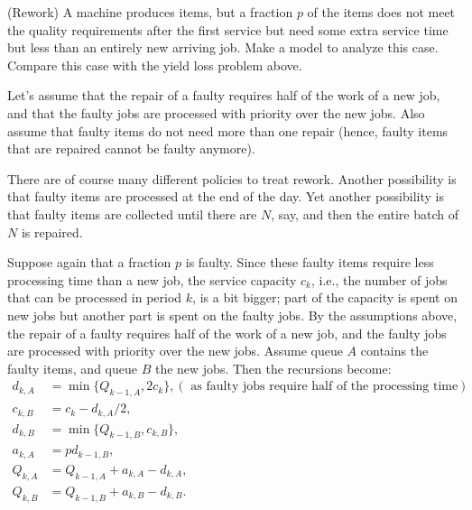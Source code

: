 \begin{exercise}
  (Rework) A machine produces items, but a fraction $p$ of the items
  does not meet the quality requirements after the first service but
  need some extra service time but less than an entirely new arriving
  job. Make a model to analyze this case. Compare this case with the
  yield loss problem above. 

  Let's assume that the repair of a faulty requires half of the work
  of a new job, and that the faulty jobs are processed with priority
  over the new jobs.  Also assume that faulty items do not need more than one repair (hence, faulty items that are repaired cannot be faulty anymore).

There are of course many different policies to
  treat rework.   Another possibility is that faulty items are processed at the end of
  the day. Yet another possibility is that faulty items are collected
  until there are $N$, say, and then the entire batch of $N$ is
  repaired.
  \begin{solution}
    Suppose again that a fraction $p$ is faulty. Since these faulty
    items require less processing time than a new job, the service
    capacity $c_k$, i.e., the number of jobs that can be processed in
    period $k$, is a bit bigger; part of the capacity is spent on new
    jobs but another part is spent on the faulty jobs. By the
    assumptions above, the repair of a faulty requires half of the
    work of a new job, and the faulty jobs are processed with priority
    over the new jobs. Assume queue $A$ contains the faulty items, and
    queue $B$ the new jobs. Then the recursions become:
\begin{equation*}
  \begin{split}
    d_{k,A} &= \min\{Q_{k-1, A}, 2c_k\}, (\text{ as faulty jobs require half of the processing time})\\
    c_{k,B} &= c_k - d_{k,A}/2, \\
    d_{k,B} &= \min\{Q_{k-1, B}, c_{k,B}\}, \\
    a_{k,A} &= p d_{k-1, B}, \\
    Q_{k,A} &= Q_{k-1, A} + a_{k,A} - d_{k,A}, \\
    Q_{k,B} &= Q_{k-1, B} + a_{k,B} - d_{k,B}.
  \end{split}
\end{equation*}
  \end{solution}
\end{exercise}


